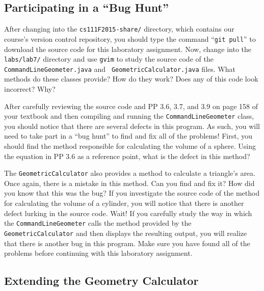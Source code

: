 \vspace*{-.1in}
\subsection*{Participating in a ``Bug Hunt''}

After changing into the {\tt cs111F2015-share/} directory, which contains our course's version control repository, you
should type the command ``{\tt git pull}'' to download the source code for this laboratory assignment. Now, change into
the {\tt labs/lab7/} directory and use {\tt gvim} to study the source code of the {\tt CommandLineGeometer.java} and {\tt
GeometricCalculator.java} files. What methods do these classes provide? How do they work? Does any of this code look
incorrect? Why?

After carefully reviewing the source code and PP 3.6, 3.7, and 3.9 on page 158 of your textbook and then compiling and
running the {\tt CommandLineGeometer} class, you should notice that there are several defects in this program. As
such, you will need to take part in a ``bug hunt'' to find and fix all of the problems! First, you should find the
method responsible for calculating the volume of a sphere. Using the equation in PP 3.6 as a reference point, what is
the defect in this method?

The {\tt GeometricCalculator} also provides a method to calculate a triangle's area.  Once again, there is a
mistake in this method.  Can you find and fix it? How did you know that this was the bug? If you investigate the source
code of the method for calculating the volume of a cylinder, you will notice that there is another defect lurking in the
source code. Wait! If you carefully study the way in which the {\tt CommandLineGeometer} calls the method
provided by the {\tt GeometricCalculator} and then displays the resulting output, you will realize that there is another
bug in this program. Make sure you have found all of the problems before continuing with this laboratory assignment.

\vspace*{-.1in}
\subsection*{Extending the Geometry Calculator}

